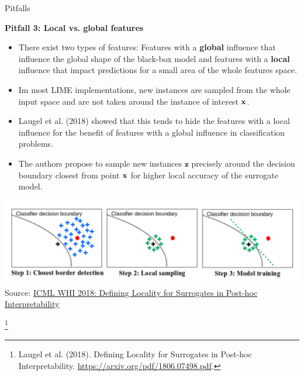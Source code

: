 \documentclass[11pt,compress,t,notes=noshow, xcolor=table]{beamer}
\newcommand{\zv}{\mathbf{z}}
\begin{document}
\begin{vbframe}{Pitfalls}

\textbf{Pitfall 3: Local vs. global features}
\begin{itemize}
	\item There exist two types of features: Features with a \textbf{global} influence that influence the global shape of the black-box model and features with a \textbf{local} influence that impact predictions for a small area of the whole features space. 
	\item Im most LIME implementations, new instances are sampled from the whole input space and are not taken around the instance of interest $\xv$.
	\item Laugel et al. (2018) showed that this tends to hide the features with a local influence for the benefit of features with a global influence in classification problems. 
	\framebreak
	\item The authors propose to sample new instances $\zv$ precisely around the decision boundary closest from point $\xv$ for higher local accuracy of the surrogate model. 
\end{itemize}
 \begin{center}
	\includegraphics[width=1\textwidth]{figure/lime_bordersample}
	{\tiny Source: \href{http://webia.lip6.fr/~laugel/files/WHI_ICML_slides.pdf}{ICML WHI 2018: Defining Locality for Surrogates in Post-hoc Interpretability}}
\end{center}
\footnote[frame]{Laugel et al. (2018). Defining Locality for Surrogates in Post-hoc Interpretability. \url{https://arxiv.org/pdf/1806.07498.pdf}.}
\end{vbframe}
\end{document}

